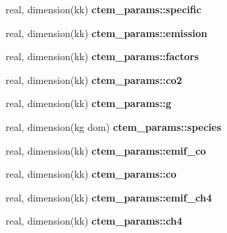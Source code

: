 \begin{DoxyCompactItemize}
\item 
\hypertarget{namespacectem__params_aa712f9b2b1d7879e676890c643b5992f}{}real, dimension(kk) {\bfseries ctem\+\_\+params\+::specific}\label{namespacectem__params_aa712f9b2b1d7879e676890c643b5992f}

\item 
\hypertarget{namespacectem__params_aedbcfe391a0c93f3ef79ff496729cedc}{}real, dimension(kk) {\bfseries ctem\+\_\+params\+::emission}\label{namespacectem__params_aedbcfe391a0c93f3ef79ff496729cedc}

\item 
\hypertarget{namespacectem__params_a2a3b7f40cc7bdd0e0aeba43af444001c}{}real, dimension(kk) {\bfseries ctem\+\_\+params\+::factors}\label{namespacectem__params_a2a3b7f40cc7bdd0e0aeba43af444001c}

\item 
\hypertarget{namespacectem__params_ac4da6e810ad2f348a33860906e14a311}{}real, dimension(kk) {\bfseries ctem\+\_\+params\+::co2}\label{namespacectem__params_ac4da6e810ad2f348a33860906e14a311}

\item 
\hypertarget{namespacectem__params_a592b8208e3f63e53c006f6d2afc69b7c}{}real, dimension(kk) {\bfseries ctem\+\_\+params\+::g}\label{namespacectem__params_a592b8208e3f63e53c006f6d2afc69b7c}

\item 
\hypertarget{namespacectem__params_a25bf958d05681eaccf0062d40ac7795f}{}real, dimension(kg dom) {\bfseries ctem\+\_\+params\+::species}\label{namespacectem__params_a25bf958d05681eaccf0062d40ac7795f}

\item 
\hypertarget{namespacectem__params_ad22701db48fc392e6905ec845347eb82}{}real, dimension(kk) {\bfseries ctem\+\_\+params\+::emif\+\_\+co}\label{namespacectem__params_ad22701db48fc392e6905ec845347eb82}

\item 
\hypertarget{namespacectem__params_a7371759a56fb51425cbf6773f083c6d4}{}real, dimension(kk) {\bfseries ctem\+\_\+params\+::co}\label{namespacectem__params_a7371759a56fb51425cbf6773f083c6d4}

\item 
\hypertarget{namespacectem__params_aa4e0d098146e23e88141b2d5804b6dfe}{}real, dimension(kk) {\bfseries ctem\+\_\+params\+::emif\+\_\+ch4}\label{namespacectem__params_aa4e0d098146e23e88141b2d5804b6dfe}

\item 
\hypertarget{namespacectem__params_a73626b99cfb4b73271dc2bc1d0f51b52}{}real, dimension(kk) {\bfseries ctem\+\_\+params\+::ch4}\label{namespacectem__params_a73626b99cfb4b73271dc2bc1d0f51b52}


\end{DoxyCompactItemize}
